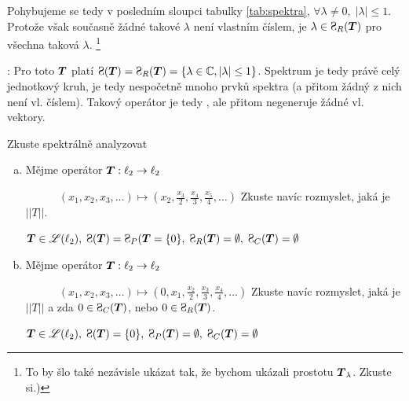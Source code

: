 {Pohybujeme se tedy v posledním sloupci tabulky \ref{tab:spektra}, $\forall \lambda \neq0,\; |\lambda|\leq1$. Protože však současně žádné takové $\lambda$ není vlastním číslem, je $\lambda \in \Sp_R(\map T)$ pro všechna taková $\lambda$. \footnote{To by šlo také nezávisle ukázat tak, že bychom ukázali prostotu $\boldsymbol{T}_\lambda$. Zkuste si.)}

: Pro toto $\boldsymbol{T}$ platí $\Sp(\map T)=\Sp_R(\map T)=\{ \lambda\in\C,|\lambda|\leq1\}$. Spektrum je tedy právě celý jednotkový kruh, je tedy nespočetně mnoho prvků spektra (a přitom žádný z nich není vl. číslem). Takový operátor je tedy , ale přitom negeneruje žádné vl. vektory.
}

\newpage
\Cviceni

Zkuste spektrálně analyzovat
\begin{enumerate}[a)]
\item Mějme operátor $\boldsymbol{T}: \ell_2\rightarrow \ell_2$

      $\quad\qquad (x_1,x_2,x_3,\dots)\mapsto \left(x_2,\frac{x_3}{2},\frac{x_4}{3},\frac{x_5}{4},\dots\right)$
      Zkuste navíc rozmyslet, jaká je $||T||$.
      
      
    \textcolor{gray}{ $\map T\in \lin(\ell_2), \; \Sp(\map T)=\Sp_P(\map T=\{0\},\; \Sp_R(\map T)=\emptyset,\; \Sp_C(\map T)=\emptyset $}
   
   \item Mějme operátor $\boldsymbol{T}: \ell_2\rightarrow \ell_2$

      $\quad\qquad (x_1,x_2,x_3,\dots)\mapsto \left(0,x_1,\frac{x_2}{2},\frac{x_3}{3},\frac{x_4}{4},\dots\right)$
Zkuste navíc rozmyslet, jaká je $||T||$ a zda $0\in \Sp_C(\map T)$, nebo $0\in \Sp_R(\map T)$.
      
      
    \textcolor{gray}{ $\map T\in \lin(\ell_2), \; \Sp(\map T)=\{0\},\; \Sp_P(\map T)=\emptyset,\; \Sp_C(\map T)=\emptyset $}
\end{enumerate}







\pagebreak